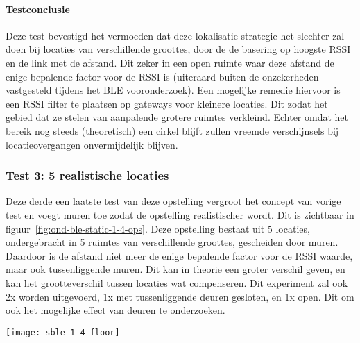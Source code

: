 \paragraph{Testconclusie}
Deze test bevestigd het vermoeden dat deze lokalisatie strategie het slechter zal doen bij locaties van verschillende groottes, door de de basering op hoogste RSSI en de link met de afstand. Dit zeker in een open ruimte waar deze afstand de enige bepalende factor voor de RSSI is (uiteraard buiten de onzekerheden vastgesteld tijdens het BLE vooronderzoek). Een mogelijke remedie hiervoor is een RSSI filter te plaatsen op gateways voor kleinere locaties. Dit zodat het gebied dat ze stelen van aanpalende grotere ruimtes verkleind. Echter omdat het bereik nog steeds (theoretisch) een cirkel blijft zullen vreemde verschijnsels bij locatieovergangen onvermijdelijk blijven.

\subsubsection{Test 3: 5 realistische locaties}
\label{sec:ond-ble-1-3}
\begin{minipage}{0.55\textwidth}
Deze derde een laatste test van deze opstelling vergroot het concept van vorige test en voegt muren toe zodat de opstelling realistischer wordt. Dit is zichtbaar in figuur~\ref{fig:ond-ble-static-1-4-ops}. Deze opstelling bestaat uit 5 locaties, ondergebracht in 5 ruimtes van verschillende groottes, gescheiden door muren. Daardoor is de afstand niet meer de enige bepalende factor voor de RSSI waarde, maar ook tussenliggende muren. Dit kan in theorie een groter verschil geven, en kan het grootteverschil tussen locaties wat compenseren. Dit experiment zal ook 2x worden uitgevoerd, 1x met tussenliggende deuren gesloten, en 1x open. Dit om ook het mogelijke effect van deuren te onderzoeken.
\end{minipage}
\hfill
\begin{minipage}{0.42\textwidth}
	\texttt{[image: sble\_1\_4\_floor]}
	\label{fig:ond-ble-static-1-4-ops}
\end{minipage}


